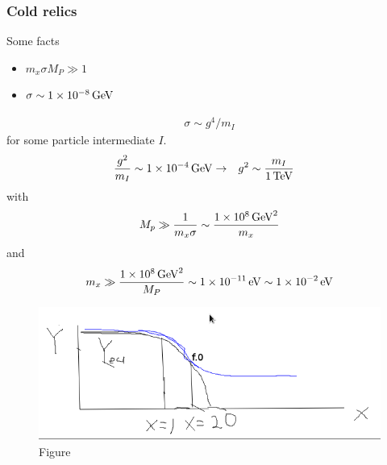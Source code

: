 \documentclass[12pt,letterpaper]{article}
\begin{document}
\subsubsection{Cold relics}
Some facts
\begin{itemize}
\item $m_x\sigma M_P\gg 1$
\item $\sigma \sim \SI{1E-8}{GeV}$
\end{itemize}
\begin{align}
  \sigma\sim g^4/m_I
\end{align}
for some particle intermediate $I$. 
\begin{align}
  \frac{g^2}{m_I}&\sim \SI{1E-4}{GeV}\to & g^2&\sim \frac{m_I}{\SI{1}{TeV}}
\end{align}
with
\begin{align}
  M_p\gg \frac{1}{m_x\sigma }\sim \frac{\SI{1E8}{GeV}^2}{m_x}
\end{align}
and
\begin{align}
  m_x\gg \frac{\SI{1E8}{GeV}^2}{M_P}\sim \SI{1E-11}{eV}\sim \SI{1E-2}{eV}
\end{align}


\begin{figure}
  \centering
  \includegraphics[scale=0.5]{fig2}

  \caption{Figure}
  \label{fig:1}
\end{figure}


%
\end{document}
